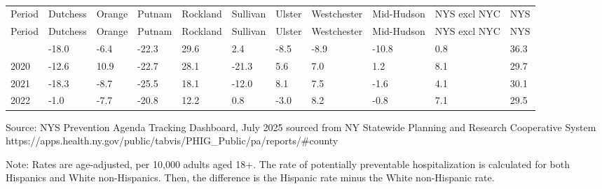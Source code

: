\documentclass[
  english,
  letterpaper,
]{report}
\begin{document}
\begin{longtable}[]{@{}lllllllllll@{}}

\caption{\label{tbl-pph-white-nh}Potentially Preventable
Hospitalizations, Rate Difference Between Hispanics and White
Non-Hispanics, 2016--2022}

\tabularnewline

\caption{}\label{T_19f75}\tabularnewline
\toprule\noalign{}
Period & Dutchess & Orange & Putnam & Rockland & Sullivan & Ulster &
Westchester & Mid-Hudson & NYS excl NYC & NYS \\
\midrule\noalign{}
\endfirsthead
\toprule\noalign{}
Period & Dutchess & Orange & Putnam & Rockland & Sullivan & Ulster &
Westchester & Mid-Hudson & NYS excl NYC & NYS \\
\midrule\noalign{}
\endhead
\bottomrule\noalign{}
\endlastfoot
2019 & -18.0 & -6.4 & -22.3 & 29.6 & 2.4 & -8.5 & -8.9 & -10.8 & 0.8 &
36.3 \\
2020 & -12.6 & 10.9 & -22.7 & 28.1 & -21.3 & 5.6 & 7.0 & 1.2 & 8.1 &
29.7 \\
2021 & -18.3 & -8.7 & -25.5 & 18.1 & -12.0 & 8.1 & 7.5 & -1.6 & 4.1 &
30.1 \\
2022 & -1.0 & -7.7 & -20.8 & 12.2 & 0.8 & -3.0 & 8.2 & -0.8 & 7.1 &
29.5 \\

\end{longtable}

\begin{tcolorbox}[enhanced jigsaw, breakable, leftrule=.75mm, title=\textcolor{quarto-callout-note-color}{\faInfo}\hspace{0.5em}{Source}, bottomrule=.15mm, opacityback=0, left=2mm, colback=white, bottomtitle=1mm, coltitle=black, colbacktitle=quarto-callout-note-color!10!white, colframe=quarto-callout-note-color-frame, opacitybacktitle=0.6, toptitle=1mm, titlerule=0mm, arc=.35mm, rightrule=.15mm, toprule=.15mm]

Source: NYS Prevention Agenda Tracking Dashboard, July 2025 sourced from
NY Statewide Planning and Research Cooperative System
https://apps.health.ny.gov/public/tabvis/PHIG\_Public/pa/reports/\#county

\end{tcolorbox}

\begin{tcolorbox}[enhanced jigsaw, breakable, leftrule=.75mm, title=\textcolor{quarto-callout-note-color}{\faInfo}\hspace{0.5em}{Note}, bottomrule=.15mm, opacityback=0, left=2mm, colback=white, bottomtitle=1mm, coltitle=black, colbacktitle=quarto-callout-note-color!10!white, colframe=quarto-callout-note-color-frame, opacitybacktitle=0.6, toptitle=1mm, titlerule=0mm, arc=.35mm, rightrule=.15mm, toprule=.15mm]

Note: Rates are age-adjusted, per 10,000 adults aged 18+. The rate of
potentially preventable hospitalization is calculated for both Hispanics
and White non-Hispanics. Then, the difference is the Hispanic rate minus
the White non-Hispanic rate.

\end{tcolorbox}
\end{document}
